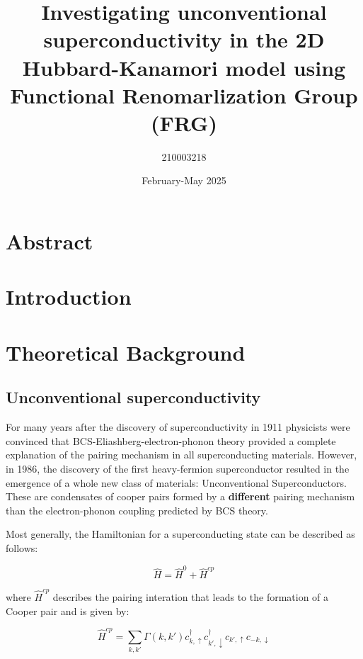 \documentclass[12pt]{article}
\title{Investigating unconventional superconductivity in the 2D Hubbard-Kanamori model using Functional Renomarlization Group (FRG)}
\author{210003218}
\date{February-May 2025}
\begin{document}
\maketitle
\tableofcontents 


\section{Abstract}

\section{Introduction}

\section{Theoretical Background}

\subsection{Unconventional superconductivity}

For many years after the discovery of superconductivity in 1911\cite{onnes1911superconductivity} physicists
were convinced that BCS-Eliashberg-electron-phonon theory \cite{schrieffer2018theory} provided a complete explanation of the pairing mechanism in all superconducting materials. 
However, in 1986, the discovery of the first heavy-fermion superconductor\cite{bednorz1986possible} resulted in the emergence of a whole new class of materials: Unconventional Superconductors. 
These are condensates of cooper pairs formed by a \textbf{different} pairing mechanism than the electron-phonon coupling predicted by BCS theory\cite{hirsch2015superconducting}. 

\medskip
\noindent Most generally, the Hamiltonian for a superconducting state can be described as follows:

\begin{equation}\label{General Hamiltonian}
    \hat{H} = \hat{H}^0 + \hat{H}^{cp}
\end{equation}

\noindent where $\hat{H}^{cp}$ describes the pairing interation that leads to the formation of a Cooper pair and is given by:

\begin{equation}\label{Hcp}
    \hat{H}^{cp} = \sum_{k,k'} \Gamma(k, k') c^{\dagger}_{k, \uparrow}  c^{\dagger}_{k', \downarrow} c_{k', \uparrow}c_{-k, \downarrow}
\end{equation}
\end{document}
